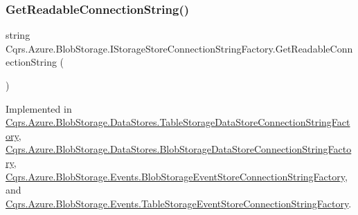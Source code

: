 \subsubsection{\texorpdfstring{Get\+Readable\+Connection\+String()}{GetReadableConnectionString()}}
{\footnotesize\ttfamily string Cqrs.\+Azure.\+Blob\+Storage.\+I\+Storage\+Store\+Connection\+String\+Factory.\+Get\+Readable\+Connection\+String (\begin{DoxyParamCaption}{ }\end{DoxyParamCaption})}



Implemented in \hyperlink{classCqrs_1_1Azure_1_1BlobStorage_1_1DataStores_1_1TableStorageDataStoreConnectionStringFactory_a0bdcd6f6d273a225c3ebcd6aa9386b95_a0bdcd6f6d273a225c3ebcd6aa9386b95}{Cqrs.\+Azure.\+Blob\+Storage.\+Data\+Stores.\+Table\+Storage\+Data\+Store\+Connection\+String\+Factory}, \hyperlink{classCqrs_1_1Azure_1_1BlobStorage_1_1DataStores_1_1BlobStorageDataStoreConnectionStringFactory_a1b5b69109d07e5612df981012d812e78_a1b5b69109d07e5612df981012d812e78}{Cqrs.\+Azure.\+Blob\+Storage.\+Data\+Stores.\+Blob\+Storage\+Data\+Store\+Connection\+String\+Factory}, \hyperlink{classCqrs_1_1Azure_1_1BlobStorage_1_1Events_1_1BlobStorageEventStoreConnectionStringFactory_aa47606e4cd5a71437bed71e07fda53ed_aa47606e4cd5a71437bed71e07fda53ed}{Cqrs.\+Azure.\+Blob\+Storage.\+Events.\+Blob\+Storage\+Event\+Store\+Connection\+String\+Factory}, and \hyperlink{classCqrs_1_1Azure_1_1BlobStorage_1_1Events_1_1TableStorageEventStoreConnectionStringFactory_a047e58aa30e97231dc913df350bc2446_a047e58aa30e97231dc913df350bc2446}{Cqrs.\+Azure.\+Blob\+Storage.\+Events.\+Table\+Storage\+Event\+Store\+Connection\+String\+Factory}.

\mbox{\label{interfaceCqrs_1_1Azure_1_1BlobStorage_1_1IStorageStoreConnectionStringFactory_a26ecfd0805fe3d525e9fa419330bd140_a26ecfd0805fe3d525e9fa419330bd140}} 
